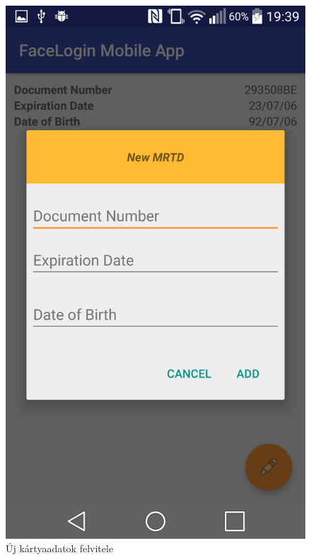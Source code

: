 \begin{figure}[h]
 \begin{minipage}{.50\textwidth} 
\centering
    \includegraphics[scale=0.10]{img/new_mrtd}
    \caption{Új kártyaadatok felvitele}
 \end{minipage}
 \begin{minipage}{.50\textwidth} 
\centering

\end{minipage}
\end{figure}
